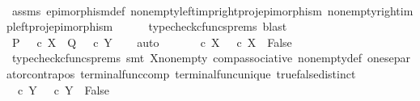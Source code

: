 \begin{isabellebody}
\ \ \ \ \isamarkupfalse%
\ assms\ epimorphism{\isacharunderscore}{\kern0pt}def{}\ nonempty{\isacharunderscore}{\kern0pt}left{\isacharunderscore}{\kern0pt}imp{\isacharunderscore}{\kern0pt}right{\isacharunderscore}{\kern0pt}proj{\isacharunderscore}{\kern0pt}epimorphism\ nonempty{\isacharunderscore}{\kern0pt}right{\isacharunderscore}{\kern0pt}imp{\isacharunderscore}{\kern0pt}left{\isacharunderscore}{\kern0pt}proj{\isacharunderscore}{\kern0pt}epimorphism\isanewline
\ \ \ \ \isamarkupfalse%
\ {\isacharparenleft}{\kern0pt}typecheck{\isacharunderscore}{\kern0pt}cfuncs{\isacharunderscore}{\kern0pt}prems{\isacharcomma}{\kern0pt}\ blast{\isacharparenright}{\kern0pt}\isanewline
\ \ \isamarkupfalse%
\ \isamarkupfalse%
\ {\isachardoublequoteopen}{\isacharparenleft}{\kern0pt}P\ {\isasymnoteq}\ {\isasymt}\ {\isasymcirc}\isactrlsub c\ {\isasymbeta}\isactrlbsub X\isactrlesub {\isacharparenright}{\kern0pt}\ {\isasymand}\ {\isacharparenleft}{\kern0pt}Q\ {\isasymnoteq}\ {\isasymt}\ {\isasymcirc}\isactrlsub c\ {\isasymbeta}\isactrlbsub Y\isactrlesub {\isacharparenright}{\kern0pt}{\isachardoublequoteclose}\isanewline
\ \ \isamarkupfalse%
\ auto\isanewline
\ \ \ \ \isamarkupfalse%
\ {\isachardoublequoteopen}{\isasymf}\ {\isasymcirc}\isactrlsub c\ {\isasymbeta}\isactrlbsub X\isactrlesub \ {\isacharequal}{\kern0pt}\ {\isasymt}\ {\isasymcirc}\isactrlsub c\ {\isasymbeta}\isactrlbsub X\isactrlesub \ {\isasymLongrightarrow}\ False{\isachardoublequoteclose}\isanewline
\ \ \ \ \ \ \isamarkupfalse%
\ {\isacharparenleft}{\kern0pt}typecheck{\isacharunderscore}{\kern0pt}cfuncs{\isacharunderscore}{\kern0pt}prems{\isacharcomma}{\kern0pt}\ smt\ X{\isacharunderscore}{\kern0pt}nonempty\ comp{\isacharunderscore}{\kern0pt}associative{}\ nonempty{\isacharunderscore}{\kern0pt}def\ one{\isacharunderscore}{\kern0pt}separator{\isacharunderscore}{\kern0pt}contrapos\ terminal{\isacharunderscore}{\kern0pt}func{\isacharunderscore}{\kern0pt}comp\ terminal{\isacharunderscore}{\kern0pt}func{\isacharunderscore}{\kern0pt}unique\ true{\isacharunderscore}{\kern0pt}false{\isacharunderscore}{\kern0pt}distinct{\isacharparenright}{\kern0pt}\isanewline
\ \ \ \ \isamarkupfalse%
\ {\isachardoublequoteopen}{\isasymf}\ {\isasymcirc}\isactrlsub c\ {\isasymbeta}\isactrlbsub Y\isactrlesub \ {\isacharequal}{\kern0pt}\ {\isasymt}\ {\isasymcirc}\isactrlsub c\ {\isasymbeta}\isactrlbsub Y\isactrlesub \ {\isasymLongrightarrow}\ False{\isachardoublequoteclose}\isanewline
\ \ \ \ \ \ \isamarkupfalse%

\end{isabellebody}
